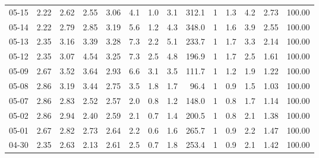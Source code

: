 \begin{threeparttable}
{\begin{tabular}{lrrrrrrrrrrrrr}
  05-15 &          2.22 &          2.62 &          2.55 &        3.06 &                 4.1 &                 1.0 &        3.1 &        312.1 &              1 &                 1.3 &              4.2 &            2.73 &                 100.00 \\
  05-14 &          2.22 &          2.79 &          2.85 &        3.19 &                 5.6 &                 1.2 &        4.3 &        348.0 &              1 &                 1.6 &              3.9 &            2.55 &                 100.00 \\
  05-13 &          2.35 &          3.16 &          3.39 &        3.28 &                 7.3 &                 2.2 &        5.1 &        233.7 &              1 &                 1.7 &              3.3 &            2.14 &                 100.00 \\
  05-12 &          2.35 &          3.07 &          4.54 &        3.25 &                 7.3 &                 2.5 &        4.8 &        196.9 &              1 &                 1.7 &              2.5 &            1.61 &                 100.00 \\
  05-09 &          2.67 &          3.52 &          3.64 &        2.93 &                 6.6 &                 3.1 &        3.5 &        111.7 &              1 &                 1.2 &              1.9 &            1.22 &                 100.00 \\
  05-08 &          2.86 &          3.19 &          3.44 &        2.75 &                 3.5 &                 1.8 &        1.7 &         96.4 &              1 &                 0.9 &              1.5 &            1.03 &                 100.00 \\
  05-07 &          2.86 &          2.83 &          2.52 &        2.57 &                 2.0 &                 0.8 &        1.2 &        148.0 &              1 &                 0.8 &              1.7 &            1.14 &                 100.00 \\
  05-02 &          2.86 &          2.94 &          2.40 &        2.59 &                 2.1 &                 0.7 &        1.4 &        200.5 &              1 &                 0.8 &              2.1 &            1.38 &                 100.00 \\
  05-01 &          2.67 &          2.82 &          2.73 &        2.64 &                 2.2 &                 0.6 &        1.6 &        265.7 &              1 &                 0.9 &              2.2 &            1.47 &                 100.00 \\
  04-30 &          2.35 &          2.63 &          2.13 &        2.61 &                 2.5 &                 0.7 &        1.8 &        253.4 &              1 &                 0.9 &              2.1 &            1.42 &                 100.00 \\

\end{tabular}}
\end{threeparttable}

